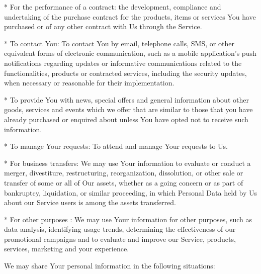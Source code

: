   * For the performance of a contract: the development, compliance and
    undertaking of the purchase contract for the products, items or services
    You have purchased or of any other contract with Us through the Service.

  * To contact You: To contact You by email, telephone calls, SMS, or other
    equivalent forms of electronic communication, such as a mobile
    application's push notifications regarding updates or informative
    communications related to the functionalities, products or contracted
    services, including the security updates, when necessary or reasonable for
    their implementation.

  * To provide You with news, special offers and general information about
    other goods, services and events which we offer that are similar to those
    that you have already purchased or enquired about unless You have opted
    not to receive such information.

  * To manage Your requests: To attend and manage Your requests to Us.

  * For business transfers: We may use Your information to evaluate or conduct
    a merger, divestiture, restructuring, reorganization, dissolution, or
    other sale or transfer of some or all of Our assets, whether as a going
    concern or as part of bankruptcy, liquidation, or similar proceeding, in
    which Personal Data held by Us about our Service users is among the assets
    transferred.

  * For other purposes : We may use Your information for other purposes, such
    as data analysis, identifying usage trends, determining the effectiveness
    of our promotional campaigns and to evaluate and improve our Service,
    products, services, marketing and your experience.


We may share Your personal information in the following situations:

